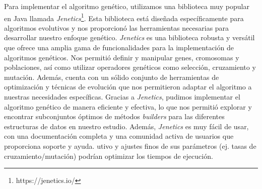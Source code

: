 Para implementar el algoritmo genético, utilizamos una biblioteca muy popular en Java llamada \emph{Jenetics}\footnote{https://jenetics.io/}. Esta biblioteca está diseñada específicamente para algoritmos evolutivos y nos proporcionó las herramientas necesarias para desarrollar nuestro enfoque genético.
\emph{Jenetics} es una biblioteca robusta y versátil que ofrece una amplia gama de funcionalidades para la implementación de algoritmos genéticos. Nos permitió definir y manipular genes, cromosomas y poblaciones, así como utilizar operadores genéticos como selección, cruzamiento y mutación. Además, cuenta con un sólido conjunto de herramientas de optimización y técnicas de evolución que nos permitieron adaptar el algoritmo a nuestras necesidades específicas.
Gracias a \emph{Jenetics}, pudimos implementar el algoritmo genético de manera eficiente y efectiva, lo que nos permitió explorar y encontrar subconjuntos óptimos de métodos \emph{builders} para las diferentes estructuras de datos en nuestro estudio. Además, \emph{Jenetics} es muy fácil de usar, con una documentación completa y una comunidad activa de usuarios que proporciona soporte y ayuda.
utivo y ajustes finos de sus parámetros (ej. tasas de cruzamiento/mutación) podrían optimizar los tiempos de ejecución.




